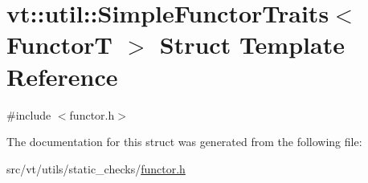 \hypertarget{structvt_1_1util_1_1_simple_functor_traits}{}\section{vt\+:\+:util\+:\+:Simple\+Functor\+Traits$<$ FunctorT $>$ Struct Template Reference}
\label{structvt_1_1util_1_1_simple_functor_traits}


{\ttfamily \#include $<$functor.\+h$>$}



The documentation for this struct was generated from the following file\+:\begin{DoxyCompactItemize}
\item 
src/vt/utils/static\+\_\+checks/\hyperlink{functor_8h}{functor.\+h}\end{DoxyCompactItemize}
